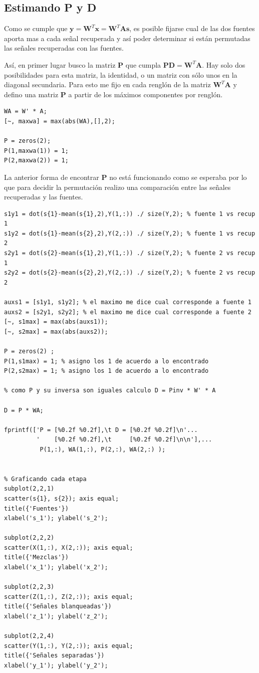\documentclass[11pt,a4paper,final]{article}
\begin{document}
\subsection*{Estimando P y D}


Como se cumple que $\mathbf{y} = \mathbf{W}^T\mathbf{x} = \mathbf{W}^T\mathbf{A}\mathbf{s}$, es posible fijarse cual de las dos fuentes aporta mas a cada señal recuperada y así poder determinar si están permutadas las señales recuperadas con las fuentes.


Así, en primer lugar busco la matriz $\mathbf{P}$ que cumpla $\mathbf{P} \mathbf{D} = \mathbf{W}^T\mathbf{A}$. Hay solo dos posibilidades para esta matriz, la identidad, o un matriz con sólo unos en la diagonal secundaria. Para esto me fijo en cada renglón de la matriz $\mathbf{W}^T\mathbf{A}$ y defino una matriz $\mathbf{P}$ a partir de los máximos componentes por renglón.

\begin{verbatim}
WA = W' * A;
[~, maxwa] = max(abs(WA),[],2);

P = zeros(2);
P(1,maxwa(1)) = 1;
P(2,maxwa(2)) = 1;
\end{verbatim}

La anterior forma de encontrar $\mathbf{P}$ no está funcionando como se esperaba por lo que para decidir la permutación realizo una comparación entre las señales recuperadas y las fuentes.

\begin{verbatim}
s1y1 = dot(s{1}-mean(s{1},2),Y(1,:)) ./ size(Y,2); % fuente 1 vs recup 1
s1y2 = dot(s{1}-mean(s{2},2),Y(2,:)) ./ size(Y,2); % fuente 1 vs recup 2
s2y1 = dot(s{2}-mean(s{1},2),Y(1,:)) ./ size(Y,2); % fuente 2 vs recup 1
s2y2 = dot(s{2}-mean(s{2},2),Y(2,:)) ./ size(Y,2); % fuente 2 vs recup 2

auxs1 = [s1y1, s1y2]; % el maximo me dice cual corresponde a fuente 1
auxs2 = [s2y1, s2y2]; % el maximo me dice cual corresponde a fuente 2
[~, s1max] = max(abs(auxs1));
[~, s2max] = max(abs(auxs2));

P = zeros(2) ;
P(1,s1max) = 1; % asigno los 1 de acuerdo a lo encontrado
P(2,s2max) = 1; % asigno los 1 de acuerdo a lo encontrado

% como P y su inversa son iguales calculo D = Pinv * W' * A

D = P * WA;

fprintf(['P = [%0.2f %0.2f],\t D = [%0.2f %0.2f]\n'...
         '    [%0.2f %0.2f],\t     [%0.2f %0.2f]\n\n'],...
          P(1,:), WA(1,:), P(2,:), WA(2,:) );


% Graficando cada etapa
subplot(2,2,1)
scatter(s{1}, s{2}); axis equal;
title({'Fuentes'})
xlabel('s_1'); ylabel('s_2');

subplot(2,2,2)
scatter(X(1,:), X(2,:)); axis equal;
title({'Mezclas'})
xlabel('x_1'); ylabel('x_2');

subplot(2,2,3)
scatter(Z(1,:), Z(2,:)); axis equal;
title({'Señales blanqueadas'})
xlabel('z_1'); ylabel('z_2');

subplot(2,2,4)
scatter(Y(1,:), Y(2,:)); axis equal;
title({'Señales separadas'})
xlabel('y_1'); ylabel('y_2');
\end{verbatim}
\end{document}
